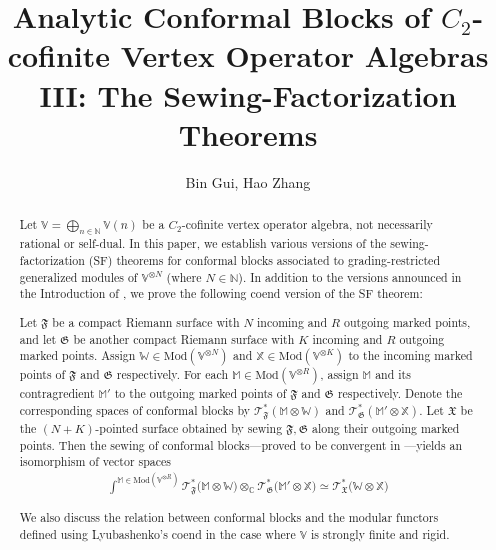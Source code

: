 \documentclass[11pt,b5paper,notitlepage]{article}
\title{Analytic Conformal Blocks of $C_2$-cofinite Vertex Operator Algebras III: The Sewing-Factorization Theorems}
\author{{\sc Bin Gui, Hao Zhang}
}
\date{}
\theoremstyle{definition}
\theoremstyle{plain}
\newcommand{\Vbb}{\mathbb V}
\newcommand{\Xbb}{\mathbb X}
\newcommand{\Wbb}{\mathbb W}
\newcommand{\Mbb}{\mathbb M}
\newcommand{\Cbb}{\mathbb C}
\newcommand{\Nbb}{\mathbb N}
\newcommand{\<}{\left\langle}
\renewcommand{\>}{\right\rangle}
\newcommand{\fx}{\mathfrak{X}}
\newcommand{\ST}{\mathscr{T}}
\newcommand{\Mod}{\mathrm{Mod}}
\newcommand{\ff}{\mathfrak{F}}
\newcommand{\fg}{\mathfrak{G}}
\numberwithin{equation}{section}
\begin{document}
\sloppy %
	\setcounter{section}{-1}
	
	
	
	\maketitle
	
	
\newcommand\blfootnote[1]{%
	\begingroup
	\renewcommand\thefootnote{}\footnote{#1}%
	\addtocounter{footnote}{-1}%
	\endgroup
}



\begin{abstract}
Let $\Vbb=\bigoplus_{n\in\Nbb}\Vbb(n)$ be a $C_2$-cofinite vertex operator algebra, not necessarily rational or self-dual. In this paper, we establish various versions of the sewing-factorization (SF) theorems for conformal blocks associated to grading-restricted generalized modules of $\Vbb^{\otimes N}$ (where $N\in\Nbb$). In addition to the versions announced in the Introduction of \cite{GZ1}, we prove the following coend version of the SF theorem:

Let $\ff$ be a compact Riemann surface with $N$ incoming and $R$ outgoing marked points, and let $\fg$ be another compact Riemann surface with $K$ incoming and $R$ outgoing marked points. Assign $\Wbb\in\Mod(\Vbb^{\otimes N})$ and $\Xbb\in\Mod(\Vbb^{\otimes K})$ to the incoming marked points of $\ff$ and $\fg$ respectively. For each $\Mbb\in\Mod(\Vbb^{\otimes R})$, assign $\Mbb$ and its contragredient $\Mbb'$ to the outgoing marked points of $\ff$ and $\fg$ respectively. Denote the corresponding spaces of conformal blocks by $\ST^*_\ff(\Mbb\otimes\Wbb)$ and $\ST^*_\fg(\Mbb'\otimes\Xbb)$. Let $\fx$ be the $(N+K)$-pointed surface obtained by sewing $\ff,\fg$ along their outgoing marked points. Then the sewing of conformal blocks---proved to be convergent in \cite{GZ2}---yields an isomorphism of vector spaces
\begin{align*}
\int^{\Mbb\in\Mod(\Vbb^{\otimes R})}\ST^*_\ff\big(\Mbb\otimes\Wbb\big)\otimes_\Cbb\ST^*_\fg\big(\Mbb'\otimes\Xbb\big)\simeq\ST_\fx^*\big(\Wbb\otimes \Xbb\big)
\end{align*}

We also discuss the relation between conformal blocks and the modular functors defined using Lyubashenko's coend in the case where $\Vbb$ is strongly finite and rigid. 
\end{abstract}
\end{document}

